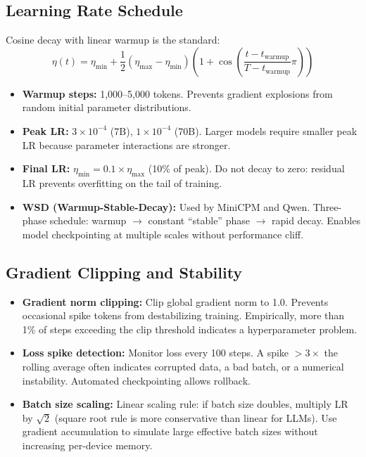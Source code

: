 \subsection{Learning Rate Schedule}

Cosine decay with linear warmup is the standard:
\[
\eta(t) = \eta_\text{min} + \frac{1}{2}\left(\eta_\text{max} - \eta_\text{min}\right)\left(1 + \cos\!\left(\frac{t - t_\text{warmup}}{T - t_\text{warmup}}\pi\right)\right)
\]

\begin{itemize}
  \item \textbf{Warmup steps:} 1,000--5,000 tokens. Prevents gradient explosions from random initial parameter distributions.
  \item \textbf{Peak LR:} $3 \times 10^{-4}$ (7B), $1 \times 10^{-4}$ (70B). Larger models require smaller peak LR because parameter interactions are stronger.
  \item \textbf{Final LR:} $\eta_\text{min} = 0.1 \times \eta_\text{max}$ (10\% of peak). Do not decay to zero: residual LR prevents overfitting on the tail of training.
  \item \textbf{WSD (Warmup-Stable-Decay):} Used by MiniCPM and Qwen. Three-phase schedule: warmup $\rightarrow$ constant ``stable'' phase $\rightarrow$ rapid decay. Enables model checkpointing at multiple scales without performance cliff.
\end{itemize}

\subsection{Gradient Clipping and Stability}

\begin{itemize}
  \item \textbf{Gradient norm clipping:} Clip global gradient norm to 1.0. Prevents occasional spike tokens from destabilizing training. Empirically, more than 1\% of steps exceeding the clip threshold indicates a hyperparameter problem.
  \item \textbf{Loss spike detection:} Monitor loss every 100 steps. A spike $>3\times$ the rolling average often indicates corrupted data, a bad batch, or a numerical instability. Automated checkpointing allows rollback.
  \item \textbf{Batch size scaling:} Linear scaling rule: if batch size doubles, multiply LR by $\sqrt{2}$ (square root rule is more conservative than linear for LLMs). Use gradient accumulation to simulate large effective batch sizes without increasing per-device memory.
\end{itemize}

